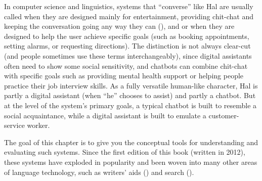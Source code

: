 In computer science and linguistics, systems that ``converse'' like Hal are usually called  when they are designed 
mainly for entertainment, providing chit-chat and keeping the conversation going any way they can (), and  or  when they are designed to help the user achieve specific goals (such as booking appointments, setting alarms, or requesting directions).   The distinction is not always clear-cut (and people sometimes use these terms interchangeably), since digital assistants often need to show some social sensitivity,
and chatbots can combine chit-chat with specific goals such as providing mental health support or helping people practice their job interview skills.
As a fully versatile human-like character, Hal is partly a digital assistant (when ``he'' chooses to assist) and partly a chatbot.   
But at the level of the system's primary goals, a typical chatbot is built to resemble a social acquaintance, while a digital assistant is built to emulate a customer-service worker. 

The goal of this chapter is to give you the conceptual tools for understanding  and evaluating such systems. Since the first edition of this book (written in 2012), these systems have exploded in popularity and been woven into many other areas of language technology, such as writers' aids () and search ().

